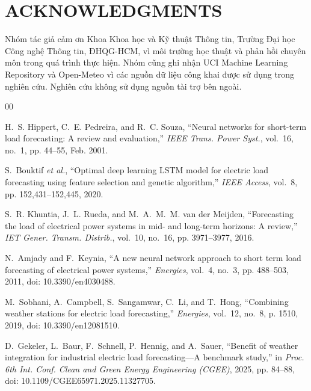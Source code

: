 \section*{ACKNOWLEDGMENTS}

Nhóm tác giả cảm ơn Khoa Khoa học và Kỹ thuật Thông tin, Trường Đại học Công nghệ Thông tin, ĐHQG-HCM, vì môi trường học thuật và phản hồi chuyên môn trong quá trình thực hiện. Nhóm cũng ghi nhận UCI Machine Learning Repository và Open-Meteo vì các nguồn dữ liệu công khai được sử dụng trong nghiên cứu. Nghiên cứu không sử dụng nguồn tài trợ bên ngoài.

\begin{thebibliography}{00}

H.~S. Hippert, C.~E. Pedreira, and R.~C. Souza, ``Neural networks
for short-term load forecasting: A review and evaluation,''
\emph{IEEE Trans. Power Syst.}, vol.~16, no.~1, pp. 44--55,
Feb. 2001.

S.~Bouktif \emph{et al.}, ``Optimal deep learning LSTM model for
electric load forecasting using feature selection and genetic
algorithm,''
\emph{IEEE Access}, vol.~8, pp. 152,431--152,445, 2020.

S.~R. Khuntia, J.~L. Rueda, and M.~A.~M.~M. van der Meijden,
``Forecasting the load of electrical power systems in mid- and
long-term horizons: A review,''
\emph{IET Gener. Transm. Distrib.},
vol.~10, no.~16, pp. 3971--3977, 2016.

N.~Amjady and F.~Keynia, ``A new neural network approach to
short term load forecasting of electrical power systems,''
\emph{Energies}, vol.~4, no.~3, pp. 488--503, 2011,
doi: 10.3390/en4030488.

M.~Sobhani, A.~Campbell, S.~Sangamwar, C.~Li, and T.~Hong,
``Combining weather stations for electric load forecasting,''
\emph{Energies}, vol.~12, no.~8, p. 1510, 2019,
doi: 10.3390/en12081510.

D.~Gekeler, L.~Baur, F.~Schnell, P.~Hennig, and A.~Sauer,
``Benefit of weather integration for industrial electric load
forecasting---A benchmark study,'' in \emph{Proc. 6th Int.
Conf. Clean and Green Energy Engineering (CGEE)}, 2025,
pp. 84--88, doi: 10.1109/CGEE65971.2025.11327705.


\end{thebibliography}
